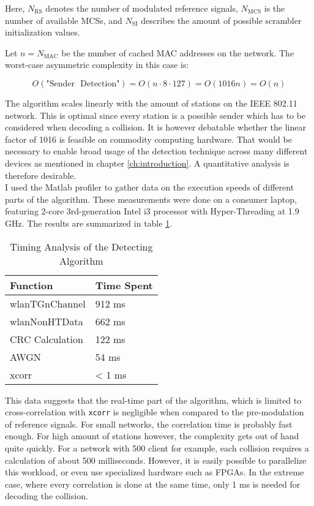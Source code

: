 Here, $ N_{\text{RS}} $ denotes the number of modulated reference signals, $ N_{\text{MCS}} $ is the number of available \glspl{MCS}, and $ N_{\text{SI}} $ describes the amount of possible scrambler initialization values.

Let $ n = N_{\text{MAC}} $ be the number of cached \gls{MAC} addresses on the network. The worst-case asymmetric complexity in this case is:

$$ O(\text{"Sender ~Detection"}) = O(n \cdot 8 \cdot 127) = O(1016 n) = O(n) $$\vspace{0cm}

The algorithm scales linearly with the amount of stations on the IEEE 802.11 network. This is optimal since every station is a possible sender which has to be considered when decoding a collision. It is however debatable whether the linear factor of 1016 is feasible on commodity computing hardware. That would be necessary to enable broad usage of the detection technique across many different devices as mentioned in chapter \ref{ch:introduction}. A quantitative analysis is therefore desirable.\\

I used the Matlab profiler to gather data on the execution speeds of different parts of the algorithm. These measurements were done on a consumer laptop, featuring 2-core 3rd-generation Intel i3 processor with Hyper-Threading at 1.9 GHz. The results are summarized in table \ref{tbl:timing}.

\begin{table}[ht]
	\centering
	\begin{tabular}{|p{8.5cm}|p{2.5cm}|}
		\hline
		\textbf{Function} & \textbf{Time Spent} \\ \hline
	    wlanTGnChannel & 912 ms \\ \hline
    	wlanNonHTData & 662 ms \\ \hline
	    CRC Calculation & 122 ms \\ \hline
	    AWGN & 54 ms \\ \hline
		xcorr & < 1 ms \\ \hline
	\end{tabular}
	\caption{Timing Analysis of the Detecting Algorithm \label{tbl:timing}}
\end{table}

This data suggests that the real-time part of the algorithm, which is limited to cross-correlation with \texttt{xcorr} is negligible when compared to the pre-modulation of reference signals. For small networks, the correlation time is probably fast enough. For high amount of stations however, the complexity gets out of hand quite quickly. For a network with 500 client for example, each collision requires a calculation of about 500 milliseconds. However, it is easily possible to parallelize this workload, or even use specialized hardware such as \glspl{FPGA}. In the extreme case, where every correlation is done at the same time, only 1 ms is needed for decoding the collision.

